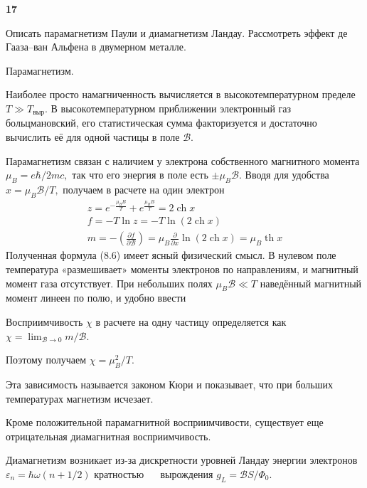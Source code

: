 \documentclass[a4paper,12pt]{article} %
\begin{document}
\begin{ttask} \textbf{17}


Описать парамагнетизм Паули и диамагнетизм Ландау. 
Рассмотреть эффект де Гааза–ван Альфена в двумерном металле. 




Парамагнетизм.


Наиболее просто намагниченность вычисляется в высокотемпературном пределе $T \gg T_{\text {выр}}$. 
В высокотемпературном приближении электронный газ больцмановский, 
его статистическая сумма факторизуется и достаточно вычислить её для одной частицы в поле $\mathcal{B}.$ 

Парамагнетизм связан с наличием у электрона собственного магнитного момента $\mu_{B}=e \hbar / 2 m c,$ 
так что его энергия в поле есть $\pm \mu_{B} \mathcal{B} .$ 
Вводя для удобства $x=\mu_{B} \mathcal{B} / T,$ получаем в расчете на один электрон
$$
\begin{array}{c}
	z=e^{-\frac{\mu_{B} B}{T}}+e^{\frac{\mu_{B} B}{T}}=2 \operatorname{ch} x 
	\\
	f=-T \ln z
	=
	-T \ln (2 \operatorname{ch} x) 
	\\
	m=-\left(\frac{\partial f}{\partial \mathcal{B}}\right)
	=
	\mu_{B} \frac{\partial}{\partial x} \ln (2 \operatorname{ch} x)
	=
	\mu_{B} \operatorname{th} x
\end{array}
$$
Полученная формула (8.6) имеет ясный физический смысл. 
В нулевом поле температура «размешивает» моменты электронов по направлениям, 
и магнитный момент газа отсутствует. 
При небольших полях $\mu_{B} \mathcal{B} \ll T$ наведённый магнитный момент линеен по полю, и удобно ввести


Восприимчивость $\chi$ в расчете на одну частицу определяется как 
$\chi=\lim _{\mathcal{B} \rightarrow 0} m / \mathcal{B} .$ 

Поэтому получаем $\chi=\mu_{B}^{2} / T .$

Эта зависимость называется законом Кюри и показывает, что при больших температурах магнетизм исчезает.






Кроме положительной парамагнитной восприимчивости, существует еще 
отрицательная диамагнитная восприимчивость. 

Диамагнетизм возникает из-за дискретности уровней Ландау энергии электронов $\varepsilon_{n}=\hbar \omega(n+1 / 2)$
кратностью $\quad$ вырождения $ g_{L}=\mathcal{B} S / \Phi_{0}$. 


\end{ttask}
\end{document}
